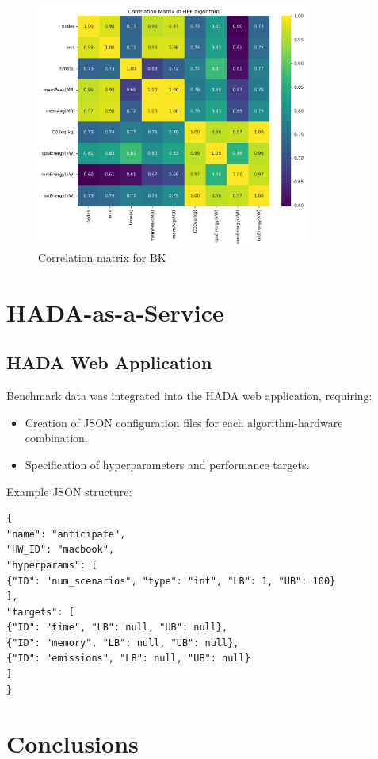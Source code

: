 \documentclass[a4paper,singleside,12pt]{report} %
\begin{document}
\begin{figure}[h!]
    \centering
    \includegraphics[width=0.8\textwidth]{imgs/hpf_corr_mat.png}
    \caption{Correlation matrix for BK}
    \label{fig:hpf_flow_corr_mat}
\end{figure}

\chapter{HADA-as-a-Service}

\section{HADA Web Application}
Benchmark data was integrated into the HADA web application, requiring:
\begin{itemize}
\item Creation of JSON configuration files for each algorithm-hardware combination.
\item Specification of hyperparameters and performance targets.
\end{itemize}

Example JSON structure:
\begin{verbatim}
{
"name": "anticipate",
"HW_ID": "macbook",
"hyperparams": [
{"ID": "num_scenarios", "type": "int", "LB": 1, "UB": 100}
],
"targets": [
{"ID": "time", "LB": null, "UB": null},
{"ID": "memory", "LB": null, "UB": null},
{"ID": "emissions", "LB": null, "UB": null}
]
}
\end{verbatim}

\chapter{Conclusions}
\end{document}
